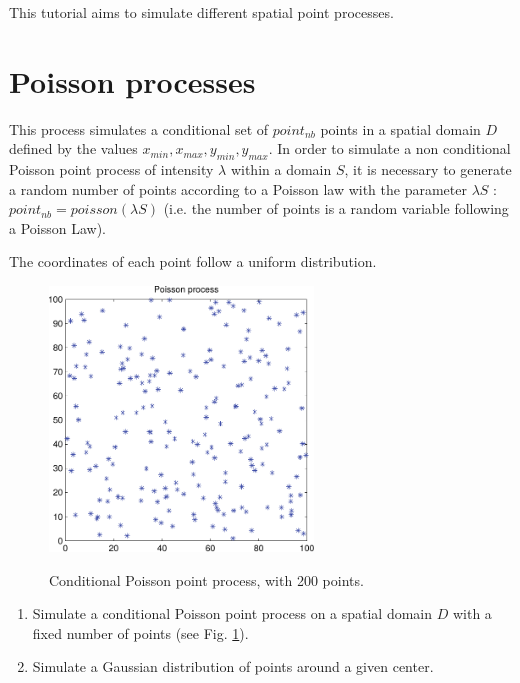 \def\difficulty{2}
\begin{note}This tutorial aims to simulate different spatial point processes.\end{note}


\section{Poisson processes}
This process simulates a conditional set of $point_{nb}$ points in a spatial domain $D$ defined by the values $x_{min}, x_{max}, y_{min}, 
y_{max}$.
In order to simulate a non conditional Poisson point process of intensity $\lambda$ within a domain $S$, it is necessary to generate a 
random number of points according to a Poisson law with the parameter $\lambda S$ : $point_{nb}=poisson(\lambda S)$ (i.e. the number of 
points is a random variable following a Poisson Law).

The coordinates of each point follow a uniform distribution.

\begin{figure}[htbp]
 \centering\caption{Conditional Poisson point process, with 200 points.}%
 \includegraphics[width=7cm]{../matlab/poissonprocess}%
 \label{fig:spatialpp:enonce:ppp}%
\end{figure}

\begin{qbox}
\begin{enumerate}
	\item Simulate a conditional Poisson point process on a spatial domain $D$ with a fixed number of points (see Fig. 
\ref{fig:spatialpp:enonce:ppp}).
	\item Simulate a Gaussian distribution of points around a given center.
\end{enumerate}
\end{qbox}

